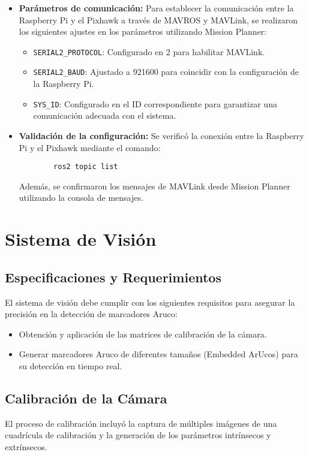 \begin{itemize}
        \item \textbf{Parámetros de comunicación:} 
        Para establecer la comunicación entre la Raspberry Pi y el Pixhawk a través de MAVROS y MAVLink, se realizaron los siguientes ajustes en los parámetros utilizando Mission Planner:
        \begin{itemize}
            \item \texttt{SERIAL2\_PROTOCOL}: Configurado en 2 para habilitar MAVLink.
            \item \texttt{SERIAL2\_BAUD}: Ajustado a 921600 para coincidir con la configuración de la Raspberry Pi.
            \item \texttt{SYS\_ID}: Configurado en el ID correspondiente para garantizar una comunicación adecuada con el sistema.
        \end{itemize}
    
        \item \textbf{Validación de la configuración:} 
        Se verificó la conexión entre la Raspberry Pi y el Pixhawk mediante el comando:
        \begin{verbatim}
        ros2 topic list
        \end{verbatim}
        Además, se confirmaron los mensajes de MAVLink desde Mission Planner utilizando la consola de mensajes.
    
    \end{itemize}
    

\section{Sistema de Visión}
\subsection{Especificaciones y Requerimientos} 
El sistema de visión debe cumplir con los siguientes requisitos para asegurar la precisión en la detección de marcadores Aruco:
    \begin{itemize}
        \item Obtención y aplicación de las matrices de calibración de la cámara.
        \item Generar marcadores Aruco de diferentes tamaños (Embedded ArUcos) para su detección en tiempo real.
    \end{itemize}

\subsection{Calibración de la Cámara} El proceso de calibración incluyó la captura de múltiples imágenes de una cuadrícula de calibración y la generación de los parámetros intrínsecos y extrínsecos.

